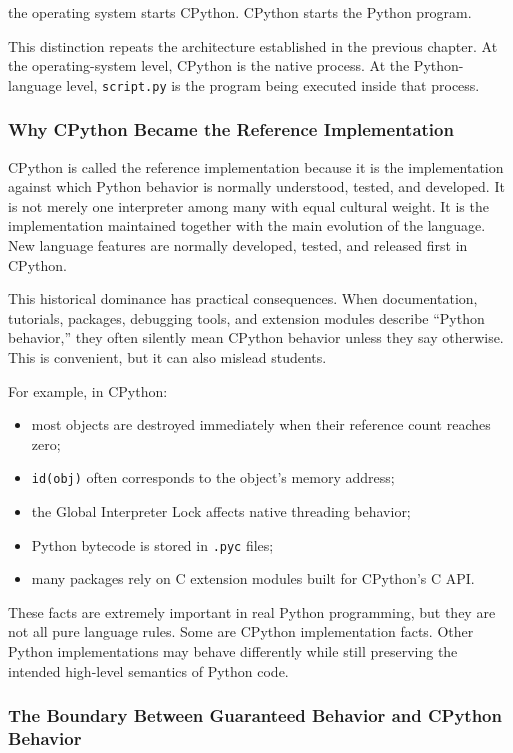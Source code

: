 the operating system starts CPython. CPython starts the Python program.

This distinction repeats the architecture established in the previous chapter. At the operating-system level, CPython is the native process. At the Python-language level, \texttt{script.py} is the program being executed inside that process.

\subsubsection{Why CPython Became the Reference Implementation}

CPython is called the reference implementation because it is the implementation against which Python behavior is normally understood, tested, and developed. It is not merely one interpreter among many with equal cultural weight. It is the implementation maintained together with the main evolution of the language. New language features are normally developed, tested, and released first in CPython.

This historical dominance has practical consequences. When documentation, tutorials, packages, debugging tools, and extension modules describe “Python behavior,” they often silently mean CPython behavior unless they say otherwise. This is convenient, but it can also mislead students.

For example, in CPython:

\begin{itemize}
    \item most objects are destroyed immediately when their reference count reaches zero;
    \item \texttt{id(obj)} often corresponds to the object's memory address;
    \item the Global Interpreter Lock affects native threading behavior;
    \item Python bytecode is stored in \texttt{.pyc} files;
    \item many packages rely on C extension modules built for CPython's C API.
\end{itemize}

These facts are extremely important in real Python programming, but they are not all pure language rules. Some are CPython implementation facts. Other Python implementations may behave differently while still preserving the intended high-level semantics of Python code.

\subsubsection{The Boundary Between Guaranteed Behavior and CPython Behavior}

